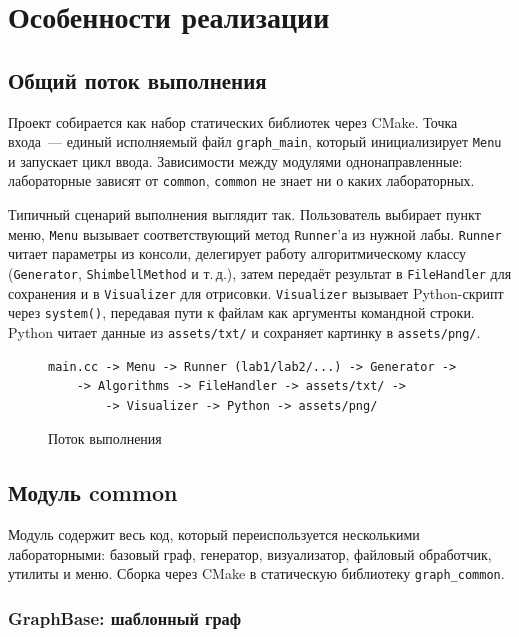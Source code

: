 \section{Особенности реализации}

\subsection{Общий поток выполнения}

Проект собирается как набор статических библиотек через CMake. Точка входа~---
единый исполняемый файл \texttt{graph\_main}, который инициализирует
\texttt{Menu} и запускает цикл ввода. Зависимости между модулями
однонаправленные: лабораторные зависят от \texttt{common}, \texttt{common}
не знает ни о каких лабораторных.

Типичный сценарий выполнения выглядит так. Пользователь выбирает пункт меню,
\texttt{Menu} вызывает соответствующий метод \texttt{Runner}'а из нужной лабы.
\texttt{Runner} читает параметры из консоли, делегирует работу алгоритмическому
классу (\texttt{Generator}, \texttt{ShimbellMethod} и т.\,д.), затем передаёт
результат в \texttt{FileHandler} для сохранения и в \texttt{Visualizer} для
отрисовки. \texttt{Visualizer} вызывает Python-скрипт через \texttt{system()},
передавая пути к файлам как аргументы командной строки. Python читает данные
из \texttt{assets/txt/} и сохраняет картинку в \texttt{assets/png/}.

\begin{figure}[h]
\centering
\begin{verbatim}
main.cc -> Menu -> Runner (lab1/lab2/...) -> Generator ->
    -> Algorithms -> FileHandler -> assets/txt/ ->
        -> Visualizer -> Python -> assets/png/
\end{verbatim}

\caption{Поток выполнения}
\end{figure}

\subsection{Модуль common}

Модуль содержит весь код, который переиспользуется несколькими лабораторными:
базовый граф, генератор, визуализатор, файловый обработчик, утилиты и меню.
Сборка через CMake в статическую библиотеку \texttt{graph\_common}.

\subsubsection{GraphBase: шаблонный граф}

